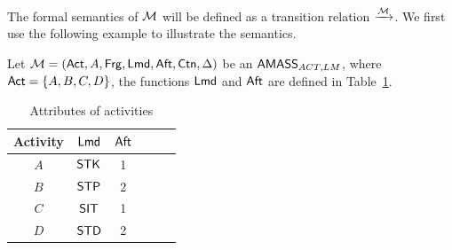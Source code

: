 The formal semantics of ${\mathcal{M} }$ will be defined as a transition relation $\xrightarrow{{\mathcal{M} }}$. 
We first use the following example to illustrate the semantics. 
\begin{example}\label{exam:iff-amass}
    Let ${\mathcal{M} } = ({\sf Act}, A,{\sf Frg},{\sf Lmd},{\sf Aft},{\sf Ctn}, \Delta)$ be an $\textsf{AMASS}_{ACT,LM}$, where ${\sf Act} = \{A, B, C, D\}$, the functions ${\sf Lmd}$ and ${\sf Aft}$ are defined in Table~\ref{tab-attribute}. 

\begin{table}[htbp]
\begin{center}
    \begin{tabular}{|c|c|c|c|c|c|}
    \hline
    Activity & ${\sf Lmd}$ & ${\sf Aft}$\\
    \hline
    $A$ & ${\sf STK}$ & 1 \\
    \hline
    $B$ & ${\sf STP}$ & 2 \\
    \hline
    $C$ & ${\sf SIT}$ & 1 \\
    \hline
    $D$ & ${\sf STD}$ & 2 \\
    \hline
    \end{tabular}
\end{center}
    \caption{Attributes of activities}
    \label{tab-attribute}
    \end{table}
        

\end{example}
